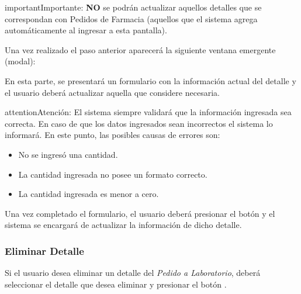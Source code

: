 \documentclass[a4paper,10pt,spanish]{sphinxmanual}
\begin{document}
\begin{notice}{important}{Importante:}
\textbf{NO} se podrán actualizar aquellos detalles que se correspondan con Pedidos de Farmacia (aquellos que el sistema agrega automáticamente al ingresar a esta pantalla).
\end{notice}

Una vez realizado el paso anterior aparecerá la siguiente ventana emergente (modal):


En esta parte, se presentará un formulario con la información actual del detalle y el usuario deberá actualizar aquella que considere necesaria.

\begin{notice}{attention}{Atención:}
El sistema siempre validará que la información ingresada sea correcta. En caso de que los datos ingresados sean incorrectos el sistema lo informará.
En este punto, las posibles causas de errores son:
\begin{itemize}
\item {} 
No se ingresó una cantidad.

\item {} 
La cantidad ingresada no posee un formato correcto.

\item {} 
La cantidad ingresada es menor a cero.

\end{itemize}
\end{notice}

Una vez completado el formulario, el usuario deberá presionar el botón  y el sistema se encargará de actualizar la información de dicho detalle.


\subsubsection{Eliminar Detalle}
\label{pedidosalab:eliminar-detalle}\label{pedidosalab:eliminar-detalle-pl}
Si el usuario desea eliminar un detalle del \emph{Pedido a Laboratorio}, deberá seleccionar el detalle que desea eliminar y presionar el botón .

\end{document}
